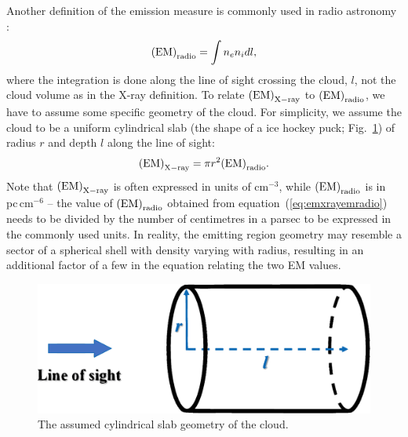 \documentclass[a4paper,fleqn,usenatbib]{mnras}
\begin{document}
Another definition of the emission measure is commonly used in radio
astronomy \citep[e.g.][]{1970ranp.book.....P}:
\begin{equation}
{\rm (EM)}_{\rm radio} = \int n_e n_i dl,
\label{eq:emxray}
\end{equation}
where the integration is done along the line of sight crossing the cloud, $l$,
not the cloud volume as in the X-ray definition. To relate ${\rm (EM)}_{\rm X-ray}$
to ${\rm (EM)}_{\rm radio}$, we have to assume some specific geometry of the
cloud. For simplicity, we assume the cloud to be a uniform cylindrical slab
(the shape of a ice hockey puck; Fig.~\ref{fig:slab}) of radius $r$ and depth $l$ along the line of sight:
\begin{equation}
{\rm (EM)}_{\rm X-ray} = \pi r^2 {\rm (EM)}_{\rm radio}.
\label{eq:emxrayemradio}
\end{equation}
Note that ${\rm (EM)}_{\rm X-ray}$ is often expressed in units of cm$^{-3}$, 
while ${\rm (EM)}_{\rm radio}$ is in pc\,cm$^{-6}$ -- the value of ${\rm (EM)}_{\rm radio}$
obtained from equation~(\ref{eq:emxrayemradio}) needs to be divided by the number 
of centimetres in a parsec to be expressed in the commonly used units.
In reality, the emitting region geometry may resemble a sector of a spherical shell with density varying with
radius, resulting in an additional factor of a few in the equation relating the
two EM values.

\begin{figure}
\begin{center} 
        \includegraphics[width=0.75\linewidth,clip=true,trim=0cm 0cm 0cm 0cm,angle=0]{cartoon_c_v2.eps}
\end{center}
\caption{The assumed cylindrical slab geometry of the cloud.}
    \label{fig:slab}
\end{figure}


\end{document}
